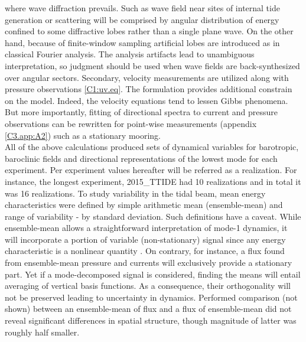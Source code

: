 \documentclass[12pt]{article}
\begin{document}
where wave diffraction prevails. Such as wave field near sites of internal tide generation or 
scattering will be comprised by angular distribution of energy confined to some diffractive lobes  
rather than a single plane wave. On the other hand, because of finite-window sampling artificial 
lobes are introduced as in classical Fourier analysis. The analysis artifacts lead to unambiguous 
interpretation, so judgment should be used when wave fields are back-synthesized over angular 
sectors. Secondary, 
velocity measurements are utilized along with pressure observations \eqref{C1:uv.eq}. The 
formulation provides 
additional constrain on the model. Indeed, the velocity equations tend to lessen Gibbs phenomena. 
But 
more importantly, fitting of directional spectra to current and pressure observations can 
be rewritten for point-wise measurements (appendix \ref{C3.app:A2}) such as a stationary mooring.\\

All of the above calculations produced sets of dynamical variables for barotropic, baroclinic 
fields and directional representations of the lowest mode for each experiment. Per experiment 
values hereafter will be referred as a realization. For instance, the longest 
experiment, 2015\_TTIDE had 10 realizations and in total it was 16 realizations. To study 
variability in the tidal beam, mean energy characteristics were defined by simple arithmetic mean 
(ensemble-mean) and range of variability - by standard deviation. Such definitions have a caveat. 
While ensemble-mean allows a 
straightforward interpretation of mode-1 dynamics, it will incorporate a portion of variable 
(non-stationary) signal since any energy characteristic is a nonlinear quantity 
\citep{zaron2014time}. On contrary, for instance, a flux found from ensemble-mean pressure and 
currents will exclusively provide a stationary part. Yet if a mode-decomposed signal is 
considered, finding the means will entail averaging of vertical basis functions. As a consequence, 
their orthogonality will not be preserved leading to uncertainty in dynamics. Performed 
comparison (not shown) between an ensemble-mean of flux and a flux of ensemble-mean did not reveal 
significant differences in spatial structure, though magnitude of latter was roughly half smaller. 

\end{document}

